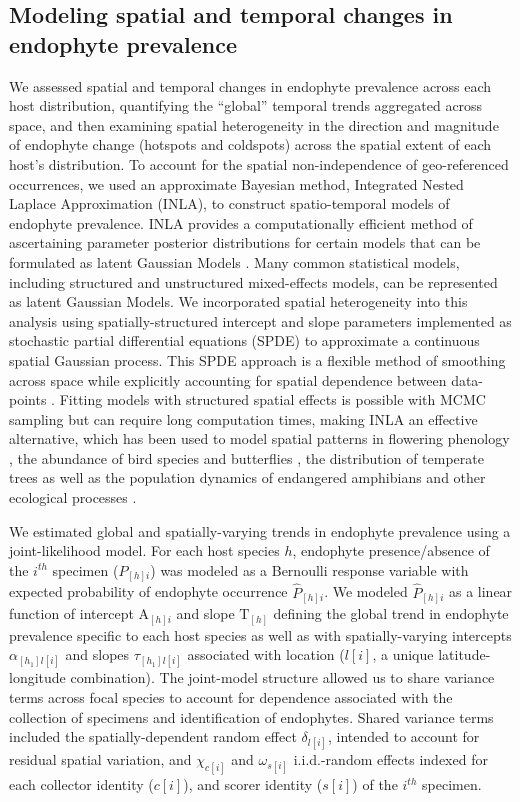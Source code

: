 \documentclass[11pt]{article}
\let\cite\citep
\begin{document}
\subsection*{Modeling spatial and temporal changes in endophyte prevalence}
We assessed spatial and temporal changes in endophyte prevalence across each host distribution, quantifying the ``global'' temporal trends aggregated across space, and then examining spatial heterogeneity in the direction and magnitude of endophyte change (hotspots and coldspots) across the spatial extent of each host's distribution.
To account for the spatial non-independence of geo-referenced occurrences, we used an approximate Bayesian method, Integrated Nested Laplace Approximation (INLA), to construct spatio-temporal models of endophyte prevalence.
INLA provides a computationally efficient method of ascertaining parameter posterior distributions for certain models that can be formulated as latent Gaussian Models \cite{rue2009approximate}.
Many common statistical models, including structured and unstructured mixed-effects models, can be represented as latent Gaussian Models.
We incorporated spatial heterogeneity into this analysis using spatially-structured intercept and slope parameters implemented as stochastic partial differential equations (SPDE) to approximate a continuous spatial Gaussian process. 
This SPDE approach is a flexible method of smoothing across space while explicitly accounting for spatial dependence between data-points \citep{lindgren2011explicit,bakka2018spatial}.
Fitting models with structured spatial effects is possible with MCMC sampling but can require long computation times, making INLA an effective alternative, which has been used to model spatial patterns in flowering phenology \cite{willems2022forest}, the abundance of bird species \cite{meehan2019spatial} and butterflies \cite{crossley2022opposing}, the distribution of temperate trees \cite{engel2022spatial} as well as the population dynamics of endangered amphibians \cite{knapp2016large} and other ecological processes \cite{beguin2012hierarchical}.

We estimated global and spatially-varying trends in endophyte prevalence using a joint-likelihood model. 
For each host species $h$, endophyte presence/absence of the $i^{th}$ specimen ($P_{[h]i}$) was modeled as a Bernoulli response variable with expected probability of endophyte occurrence $\hat{P}_{[h]i}$.
We modeled $\hat{P}_{[h]i}$ as a linear function of intercept $ \mathrm{A}_{[h]i}$ and slope $\mathrm{T}_{[h]}$ defining the global trend in endophyte prevalence specific to each host species as well as with spatially-varying intercepts $\alpha_{[h_{1}]l[i]}$ and slopes $\tau_{[h_{1}]l[i]}$ associated with location ($l[i]$, a unique latitude-longitude combination).
The joint-model structure allowed us to share variance terms across focal species to account for dependence associated with the collection of specimens and identification of endophytes. 
Shared variance terms included the spatially-dependent random effect $\delta_{l[i]}$, intended to account for residual spatial variation, and $\chi_{c[i]}$ and $\omega_{s[i]}$ i.i.d.-random effects indexed for each collector identity ($c[i]$), and scorer identity ($s[i]$) of the $i^{th}$ specimen.
\end{document}
